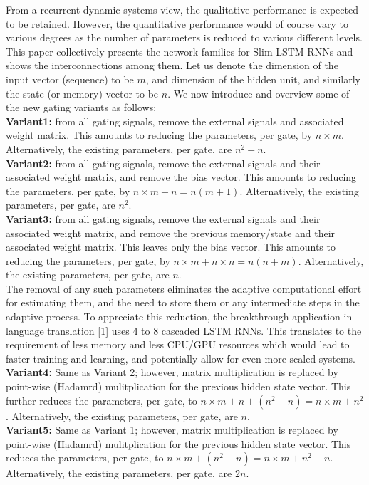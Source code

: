 \documentclass{article}
\begin{document}
From a recurrent dynamic systems view, the qualitative performance is expected to be retained. However, the quantitative performance would of course vary to various degrees as the number of parameters is reduced to various different levels. \\

This paper collectively presents the network families for Slim LSTM RNNs and shows the interconnections among them. Let us denote the dimension of the input vector (sequence) to be $m$, and dimension of the hidden unit, and similarly the state (or memory) vector to be $n$.
We now introduce and overview some of the new gating variants as follows: \\
\textbf{Variant1:} from all gating signals, remove the external signals and associated weight matrix. This amounts to reducing the parameters, per gate, by $n \times m$. Alternatively, the existing parameters, per gate, are $n^2 +n$. \\
\textbf{Variant2:} from all gating signals, remove the external signals and their associated weight matrix, and remove the bias vector. This amounts to reducing the parameters, per gate, by
$n \times m+n = n(m+1)$.  Alternatively, the existing parameters, per gate, are $n^2$. \\
\textbf{Variant3:} from all gating signals, remove the external signals and their associated weight matrix, and remove the previous memory/state and their associated weight matrix. This leaves only the bias vector. This amounts to reducing the parameters, per gate, by  $n \times m+n \times n=n(n+m)$. Alternatively, the existing parameters, per gate, are $n$. \\

The removal of any such parameters eliminates the adaptive computational effort for estimating them, and the need to store them or any intermediate steps in the adaptive process.  To appreciate this reduction, the breakthrough application in language translation [1] uses 4 to 8 cascaded LSTM RNNs. This translates to the requirement of less memory and less CPU/GPU resources which would lead to faster training and learning, and potentially allow for even more scaled systems. \\
\textbf{Variant4:} Same as Variant 2; however, matrix multiplication is replaced by point-wise (Hadamrd) mulitplication for the previous hidden state vector. This further reduces the parameters, per gate, to
$n \times m+n+(n^2-n) = n \times m +n^2$.  Alternatively, the existing parameters, per gate, are $n$. \\
\textbf{Variant5:} Same as Variant 1; however, matrix multiplication is replaced by point-wise (Hadamrd) mulitplication for the previous hidden state vector. This reduces the parameters, per gate, to
$n \times m+(n^2-n) = n \times m +n^2-n$.  Alternatively, the existing parameters, per gate, are $2n$. \\
\end{document}
